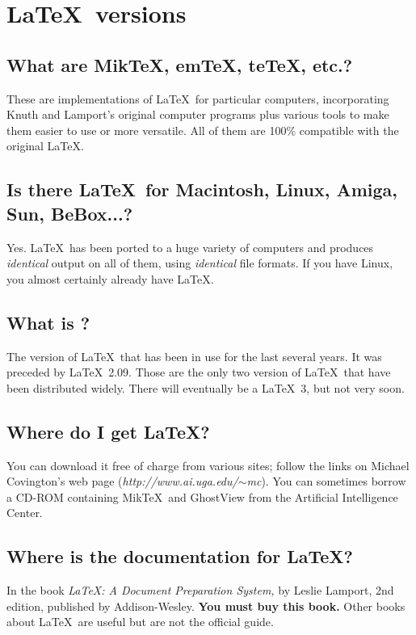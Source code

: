 \documentclass[12pt]{report}
\begin{document}
\section{\LaTeX\ versions}

\subsection{What are Mik\TeX, em\TeX, te\TeX, etc.?}

These are implementations of \LaTeX\ for particular computers, incorporating Knuth and Lamport's
original computer programs plus various tools to make them easier to use or more versatile.
All of them are 100\% compatible with the original \LaTeX.

\subsection{Is there \LaTeX\ for Macintosh, Linux, Amiga, Sun, BeBox...?}

Yes.  \LaTeX\ has been ported to a huge variety of computers and produces \emph{identical}
output on all of them, using \emph{identical} file formats.
If you have Linux, you almost certainly already have \LaTeX.

\subsection{What is \LaTeXe?}

The version of \LaTeX\ that has been in use for the last several years.  It was
preceded by \LaTeX\ 2.09.  Those are the only two version of \LaTeX\ that have been
distributed widely.  There will eventually be a \LaTeX\ 3, but not very soon.

\subsection{Where do I get \LaTeX?}

You can download it free of charge from various sites; follow the links on Michael Covington's
web page (\emph{http://www.ai.uga.edu/$\sim$mc}).  You can sometimes borrow a CD-ROM containing
Mik\TeX\ and GhostView from the Artificial Intelligence Center.

\subsection{Where is the documentation for \LaTeX?}

In the book \emph{LaTeX: A Document Preparation System,} by Leslie Lamport, 2nd edition,
published by Addison-Wesley.  \textbf{You must buy this book.}  Other books about \LaTeX\ are useful
but are not the official guide.
\end{document}
